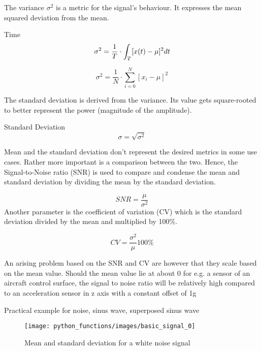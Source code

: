 The variance $\sigma^2$ is a metric for the signal's behaviour. It expresses the mean squared deviation from the mean.

Time
\begin{equation}
    \label{eq:var_cont}
    \sigma^2=\frac{1}{T} \cdot \int_T[x(t)-\mu]^2 d t\\
\end{equation}

\begin{equation}
    \label{eq:var_disc}
\sigma^2=\frac{1}{N} \cdot \sum_{i=0}^{N}\left[x_i-\mu\right]^2
\end{equation}

The standard deviation is derived from the variance. Its value gets square-rooted to better represent the power (magnitude of the amplitude).

Standard Deviation
\begin{equation}
    \label{eq:stdev_disc}
    \sigma = \sqrt{\sigma^2}
\end{equation}

Mean and the standard deviation don't represent the desired metrics in some use cases. Rather more important is a comparison between the two. Hence, the Signal-to-Noise ratio (SNR) is used to compare and condense the mean and standard deviation by dividing the mean by the standard deviation.

\begin{equation}
    \label{eq:snr}
    SNR=\frac{\mu}{\sigma^2}
\end{equation}
 Another parameter is the coefficient of variation (CV) which is the standard deviation divided by the mean and multiplied by 100\%.

\begin{equation}
    \label{eq:coeff_var}
    CV = \frac{\sigma^2}{\mu}100\%
\end{equation}

An arising problem based on the SNR and CV are however that they scale based on the mean value. Should the mean value lie at about 0 for e.g. a sensor of an aircraft control surface, the signal to noise ratio will be relatively high compared to an acceleration sensor in z axis with a constant offset of 1g

Practical example for noise, sinus wave, superposed sinus wave
\begin{figure}[h]
         \centering
         \texttt{[image: python\_functions/images/basic\_signal\_0]}
         \caption{Mean and standard deviation for a white noise signal}
         \label{fig:signal_basic}
\end{figure}

